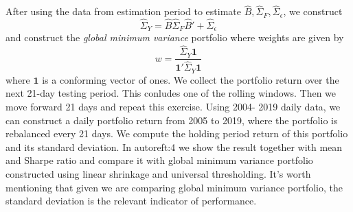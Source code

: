 After using the data from estimation period to estimate \(\hat{B} ,\hat{\Sigma}_{F}, \hat{\Sigma}_{\epsilon}\), we construct 
\begin{equation*}
    \hat{\Sigma}_{Y} = \hat{B} \hat{\Sigma}_{F} \hat{B}' + \hat{\Sigma}_{\epsilon} 
\end{equation*}
and construct the \textit{global minimum variance} portfolio where weights are given by 
\begin{equation*}
    w = \frac{\hat{\Sigma}_{Y} \mathbf{1}}{\mathbf{1}' \hat{\Sigma}_{Y} \mathbf{1}}
\end{equation*}
where \(\mathbf{1}\) is a conforming vector of ones. We collect the portfolio return over the next 21-day testing period. This conludes one of the rolling windows. Then we move forward 21 days and repeat this exercise. Using 2004- 2019 daily data, we can construct a daily portfolio return from 2005 to 2019, where the portfolio is rebalanced every 21 days. We compute the holding period return of this portfolio and its standard deviation. In autoref{t:4} we show the result together with mean and Sharpe ratio and compare it with global minimum variance portfolio constructed using linear shrinkage and universal thresholding. It's worth mentioning that given we are comparing global minimum variance portfolio, the standard deviation is the relevant indicator of performance.  



